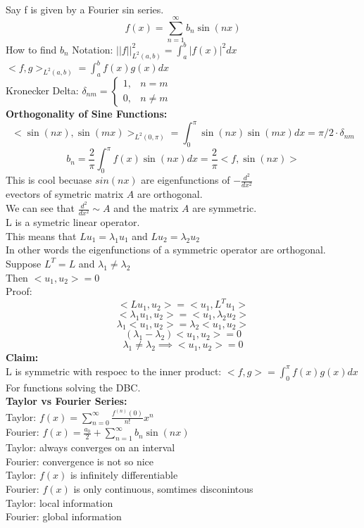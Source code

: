 \documentclass{article}
\begin{document}
\textbf{}\\
Say f is given by a Fourier sin series. \\
$$ f(x) = \sum_{n=1}^{\infty} b_n \sin(nx)$$
How to find $b_n$
Notation: $||f||_{L^2(a,b)}^2= \int_a^b |f(x)|^2 dx$\\
$<f,g>_{L^2(a,b)} = \int_a^b f(x)g(x) dx$\\
Kronecker Delta: $\delta_{nm} = \begin{cases}
    1, & n = m\\
    0, & n \neq m
\end{cases}$\\
\textbf{Orthogonality of Sine Functions:} \\
$$ <\sin(nx), \sin(mx)>_{L^2(0,\pi)} = \int_0^\pi \sin(nx) \sin(mx) dx = \pi/2 \cdot \delta_{nm}$$
$$b_n = \frac{2}{\pi} \int_0^\pi f(x) \sin(nx) dx = \frac{2}{\pi} <f,\sin(nx)>$$
This is cool becuase $sin(nx)$ are eigenfunctions of $-\frac{d^2}{dx^2}$\\
evectors of symetric matrix $A$ are orthogonal.\\
We can see that $\frac{d^2}{dx^2} \sim A$ and the matrix $A$ are symmetric.\\
L is a symetric linear operator.\\
This means that $Lu_1 = \lambda_1 u_1$ and $Lu_2 = \lambda_2 u_2$\\
In other words the eigenfunctions of a symmetric operator are orthogonal.\\
Suppose $L^T = L$ and $\lambda_1 \neq \lambda_2$\\
Then $<u_1, u_2> = 0$\\
Proof:\\
$$<Lu_1, u_2> = <u_1, L^Tu_1> $$
$$<\lambda_1 u_1, u_2> = <u_1, \lambda_2 u_2>$$
$$\lambda_1 <u_1, u_2> = \lambda_2 <u_1, u_2>$$
$$ (\lambda_1 - \lambda_2) <u_1, u_2> = 0$$
$$ \lambda_1 \neq \lambda_2 \implies <u_1, u_2> = 0$$
\textbf{Claim:} \\  
L is symmetric with respoec to the inner product: $<f,g> = \int_0^\pi f(x)g(x) dx$\\
For functions solving the DBC.\\
\textbf{Taylor vs Fourier Series:} \\
Taylor: $f(x) = \sum_{n=0}^{\infty} \frac{f^{(n)}(0)}{n!} x^n$\\
Fourier: $f(x) = \frac{a_0}{2} + \sum_{n=1}^{\infty} b_n \sin(nx)$\\
Taylor: always converges on an interval\\
Fourier: convergence is not so nice\\
Taylor: $f(x)$ is infinitely differentiable\\
Fourier: $f(x)$ is only continuous, somtimes disconintous\\
Taylor: local information\\
Fourier: global information\\
\end{document}
